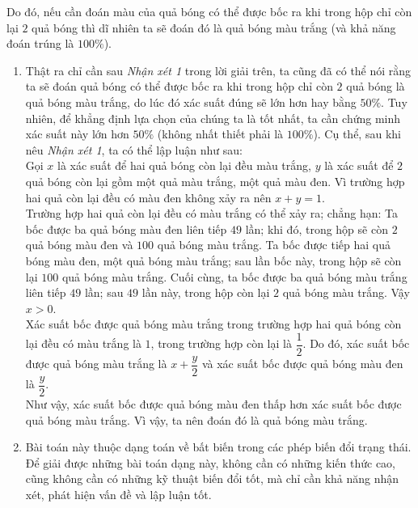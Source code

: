 \begin{bt}
{Do đó, nếu cần đoán màu của quả bóng có thể được bốc ra khi trong hộp chỉ còn lại $2$ quả bóng thì dĩ nhiên ta sẽ đoán đó là quả bóng màu trắng (và khả năng đoán trúng là $100\%$).
\begin{nx}\hfill
\begin{enumerate}[\bf 1.]
\item Thật ra chỉ cần sau \textit{Nhận xét 1} trong lời giải trên, ta cũng đã có thể nói rằng ta sẽ đoán quả bóng có thể được bốc ra khi trong hộp chỉ còn $2$ quả bóng là quả bóng màu trắng, do lúc đó xác suất đúng sẽ lớn hơn hay bằng $50\%$. Tuy nhiên, để khẳng định lựa chọn của chúng ta là tốt nhất, ta cần chứng minh xác suất này lớn hơn $50\%$ (không nhất thiết phải là $100\%$). Cụ thể, sau khi nêu \textit{Nhận xét 1}, ta có thể lập luận như sau:\\
Gọi $x$ là xác suất để hai quả bóng còn lại đều màu trắng, $y$ là xác suất để $2$ quả bóng còn lại gồm một quả màu trắng, một quả màu đen. Vì trường hợp hai quả còn lại đều có màu đen không xảy ra nên $x+y=1$.\\
Trường hợp hai quả còn lại đều có màu trắng có thể xảy ra; chẳng hạn: Ta bốc được ba quả bóng màu đen liên tiếp $49$ lần; khi đó, trong hộp sẽ còn $2$ quả bóng màu đen và $100$ quả bóng màu trắng. Ta bốc được tiếp hai quả bóng màu đen, một quả bóng màu trắng; sau lần bốc này, trong hộp sẽ còn lại $100$ quả bóng màu trắng. Cuối cùng, ta bốc được ba quả bóng màu trắng liên tiếp $49$ lần; sau $49$ lần này, trong hộp còn lại $2$ quả bóng màu trắng. Vậy $x>0$.\\
Xác suất bốc được quả bóng màu trắng trong trường hợp hai quả bóng còn lại đều có màu trắng là $1$, trong trường hợp còn lại là $\dfrac{1}{2}$. Do đó, xác suất bốc được quả bóng màu trắng là $x+\dfrac{y}{2}$ và xác suất bốc được quả bóng màu đen là $\dfrac{y}{2}$.\\
Như vậy, xác suất bốc được quả bóng màu đen thấp hơn xác suất bốc được quả bóng màu trắng. Vì vậy, ta nên đoán đó là quả bóng màu trắng.
\item Bài toán này thuộc dạng toán về bất biến trong các phép biến đổi trạng thái. Để giải được những bài toán dạng này, không cần có những kiến thức cao, cũng không cần có những kỹ thuật biến đổi tốt, mà chỉ cần khả năng nhận xét, phát hiện vấn đề và lập luận tốt.
\end{enumerate}
\end{nx}
}
\end{bt}


